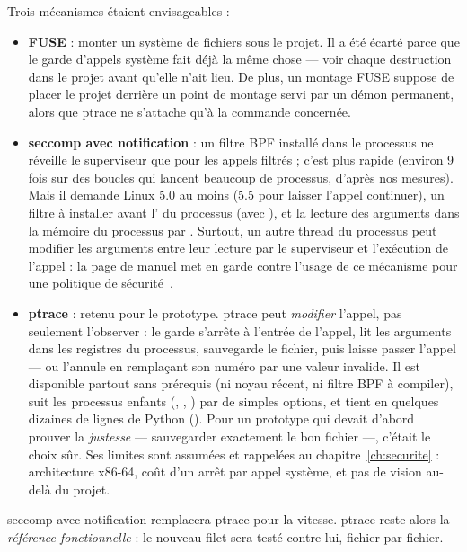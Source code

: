 Trois mécanismes étaient envisageables :
\begin{itemize}
  \item \textbf{FUSE} : monter un système de fichiers sous le projet. Il a été écarté parce que
    le garde d'appels système fait déjà la même chose --- voir chaque destruction dans le
    projet avant qu'elle n'ait lieu. De plus, un montage FUSE suppose de placer le projet
    derrière un point de montage servi par un démon permanent, alors que ptrace ne s'attache
    qu'à la commande concernée.
  \item \textbf{seccomp avec notification} : un filtre BPF installé dans le processus ne réveille
    le superviseur que pour les appels filtrés ; c'est plus rapide (environ 9 fois sur des
    boucles qui lancent beaucoup de processus, d'après nos mesures). Mais il demande Linux 5.0
    au moins (5.5 pour laisser l'appel continuer), un filtre à installer avant l' du
    processus (avec ), et la lecture des arguments dans la mémoire du
    processus par . Surtout, un autre thread du processus peut modifier les
    arguments entre leur lecture par le superviseur et l'exécution de l'appel : la page de
    manuel met en garde contre l'usage de ce mécanisme pour une politique de
    sécurité~\cite{man-seccomp-unotify}.
  \item \textbf{ptrace} : retenu pour le prototype. ptrace peut \emph{modifier} l'appel, pas
    seulement l'observer : le garde s'arrête à l'entrée de l'appel, lit les arguments dans les
    registres du processus, sauvegarde le fichier, puis laisse passer l'appel --- ou l'annule en
    remplaçant son numéro par une valeur invalide. Il est disponible partout sans prérequis (ni
    noyau récent, ni filtre BPF à compiler), suit les processus enfants (,
    , ) par de simples options, et tient en quelques dizaines de lignes de
    Python (). Pour un prototype qui devait d'abord prouver la \emph{justesse} ---
    sauvegarder exactement le bon fichier ---, c'était le choix sûr. Ses limites sont assumées et
    rappelées au chapitre~\ref{ch:securite} : architecture x86-64, coût d'un arrêt par appel
    système, et pas de vision au-delà du projet.
\end{itemize}

\begin{pourquoi}
seccomp avec notification remplacera ptrace pour la vitesse. ptrace reste alors la
\emph{référence fonctionnelle} : le nouveau filet sera testé contre lui, fichier par fichier.
\end{pourquoi}

